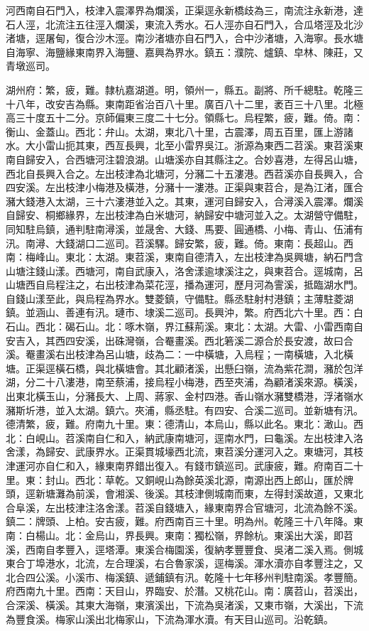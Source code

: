 \begin{pinyinscope}
河西南自石門入，枝津入震澤界為爛溪，正渠逕永新橋歧為三，南流注永新港，達石人涇，北流注五往涇入爛溪，東流入秀水。石人涇亦自石門入，合瓜塔涇及北沙渚塘，逕屠甸，復合沙木涇。南沙渚塘亦自石門入，合中沙渚塘，入海寧。長水塘自海寧、海鹽緣東南界入海鹽、嘉興為界水。鎮五：濮院、爐鎮、皁林、陳莊，又青墩巡司。

湖州府：繁，疲，難。隸杭嘉湖道。明，領州一，縣五。副將、所千總駐。乾隆三十八年，改安吉為縣。東南距省治百八十里。廣百八十二里，袤百三十八里。北極高三十度五十二分。京師偏東三度二十七分。領縣七。烏程繁，疲，難。倚。南：衡山、金蓋山。西北：弁山。太湖，東北八十里，古震澤，周五百里，匯上游諸水。大小雷山扼其東，西亙長興，北至小雷界吳江。浙源為東西二苕溪。東苕溪東南自歸安入，合西塘河注碧浪湖。山塘溪亦自其縣注之。合妙喜港，左得呂山塘，西北自長興入合之。左出枝津為北塘河，分瀦二十五漊港。西苕溪亦自長興入，合四安溪。左出枝津小梅港及橫港，分瀦十一漊港。正渠與東苕合，是為江渚，匯合瀦大錢港入太湖，三十六漊港並入之。其東，運河自歸安入，合潯溪入震澤。爛溪自歸安、桐鄉緣界，左出枝津為白米塘河，納歸安中塘河並入之。太湖營守備駐，同知駐烏鎮，通判駐南潯溪，並晟舍、大錢、馬要、圓通橋、小梅、青山、伍浦有汛。南潯、大錢湖口二巡司。苕溪驛。歸安繁，疲，難。倚。東南：長超山。西南：梅峰山。東北：太湖。東苕溪，東南自德清入，左出枝津為吳興塘，納石門含山塘注錢山漾。西塘河，南自武康入，洛舍漾逾埭溪注之，與東苕合。逕城南，呂山塘西自烏程注之，右出枝津為菜花涇，播為運河，歷月河為霅溪，抵臨湖水門。自錢山漾至此，與烏程為界水。雙菱鎮，守備駐。縣丞駐射村港鎮；主薄駐菱湖鎮。並涵山、善連有汛。璉巿、埭溪二巡司。長興沖，繁。府西北六十里。西：白石山。西北：碣石山。北：啄木嶺，界江蘇荊溪。東北：太湖。大雷、小雷西南自安吉入，其西四安溪，出硃灣嶺，合罨畫溪。西北箬溪二源合於長安渡，故曰合溪。罨畫溪右出枝津為呂山塘，歧為二：一中橫塘，入烏程；一南橫塘，入北橫塘。正渠逕橫石橋，與北橫塘會。其北顧渚溪，出懸臼嶺，流為紫花澗，瀦於包洋湖，分二十八漊港，南至蔡浦，接烏程小梅港，西至夾浦，為顧渚溪來源。橫溪，出東北橫玉山，分瀦長大、上周、蔣家、金村四港。香山嶺水瀦雙橋港，浮渚嶺水瀦斯圻港，並入太湖。鎮六。夾浦，縣丞駐。有四安、合溪二巡司。並新塘有汛。德清繁，疲，難。府南九十里。東：德清山，本烏山，縣以此名。東北：澉山。西北：白峴山。苕溪南自仁和入，納武康南塘河，逕南水門，曰龜溪。左出枝津入洛舍漾，為歸安、武康界水。正渠貫城壕西北流，東苕溪分運河入之。東塘河，其枝津運河亦自仁和入，緣東南界錯出復入。有錢巿鎮巡司。武康疲，難。府南百二十里。東：封山。西北：草乾。又銅峴山為餘英溪北源，南源出西上郎山，匯於牌頭，逕新塘灘為前溪，會湘溪、後溪。其枝津側城南而東，左得封溪故道，又東北合阜溪，左出枝津注洛舍漾。苕溪自錢塘入，緣東南界合官塘河，北流為餘不溪。鎮二：牌頭、上柏。安吉疲，難。府西南百三十里。明為州。乾隆三十八年降。東南：白楊山。北：金烏山，界長興。東南：獨松嶺，界餘杭。東溪出大溪，即苕溪，西南自孝豐入，逕塔潭。東溪合梅園溪，復納孝豐豐食、吳渚二溪入焉。側城東合丁埠港水，北流，左合理溪，右合魯家溪，逕梅溪。渾水瀆亦自孝豐注之，又北合四公溪。小溪巿、梅溪鎮、遞鋪鎮有汛。乾隆十七年移州判駐南溪。孝豐簡。府西南九十里。西南：天目山，界臨安、於潛。又桃花山。南：廣苕山，苕溪出，合深溪、橫溪。其東大海嶺，東濱溪出，下流為吳渚溪，又東巿嶺，大溪出，下流為豐食溪。梅家山溪出北梅家山，下流為渾水瀆。有天目山巡司。沿乾鎮。


\end{pinyinscope}
